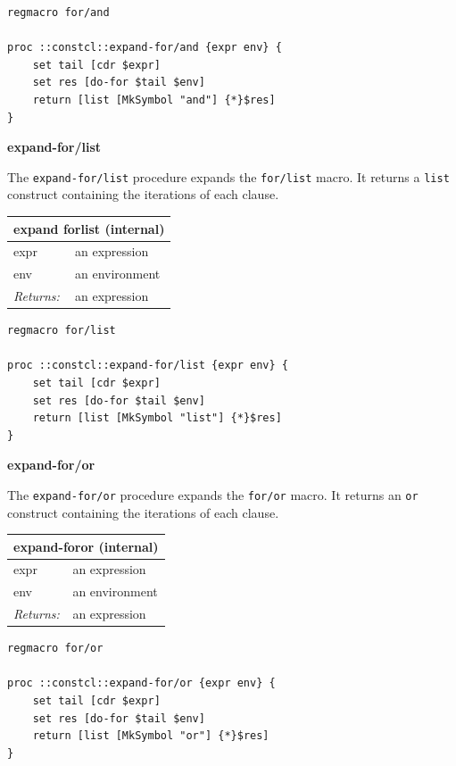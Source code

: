 \documentclass[twoside,9pt]{report}
\begin{document}
\noindent\makebox[\linewidth]{\rule{\linewidth}{0.4pt}}
\begin{lstlisting}
regmacro for/and
 
proc ::constcl::expand-for/and {expr env} {
    set tail [cdr $expr]
    set res [do-for $tail $env]
    return [list [MkSymbol "and"] {*}$res]
}
\end{lstlisting}
\noindent\makebox[\linewidth]{\rule{\linewidth}{0.4pt}}

\textbf{expand-for/list}


The \texttt{expand-for/list} procedure expands the \texttt{for/list} macro. It returns a \texttt{list} construct containing the iterations of each clause.

\begin{tabular}{ |l l| }
\hline
\multicolumn{2}{|l|}{expand forlist (internal)} \\
\hline
expr & an expression \\
env & an environment \\
\textit{Returns:} & an expression \\
\hline
\end{tabular}

\noindent\makebox[\linewidth]{\rule{\linewidth}{0.4pt}}
\begin{lstlisting}
regmacro for/list
 
proc ::constcl::expand-for/list {expr env} {
    set tail [cdr $expr]
    set res [do-for $tail $env]
    return [list [MkSymbol "list"] {*}$res]
}
\end{lstlisting}
\noindent\makebox[\linewidth]{\rule{\linewidth}{0.4pt}}

\textbf{expand-for/or}


The \texttt{expand-for/or} procedure expands the \texttt{for/or} macro. It returns an \texttt{or} construct containing the iterations of each clause.

\begin{tabular}{ |l l| }
\hline
\multicolumn{2}{|l|}{expand-foror (internal)} \\
\hline
expr & an expression \\
env & an environment \\
\textit{Returns:} & an expression \\
\hline
\end{tabular}

\noindent\makebox[\linewidth]{\rule{\linewidth}{0.4pt}}
\begin{lstlisting}
regmacro for/or
 
proc ::constcl::expand-for/or {expr env} {
    set tail [cdr $expr]
    set res [do-for $tail $env]
    return [list [MkSymbol "or"] {*}$res]
}
\end{lstlisting}
\noindent\makebox[\linewidth]{\rule{\linewidth}{0.4pt}}
\end{document}
